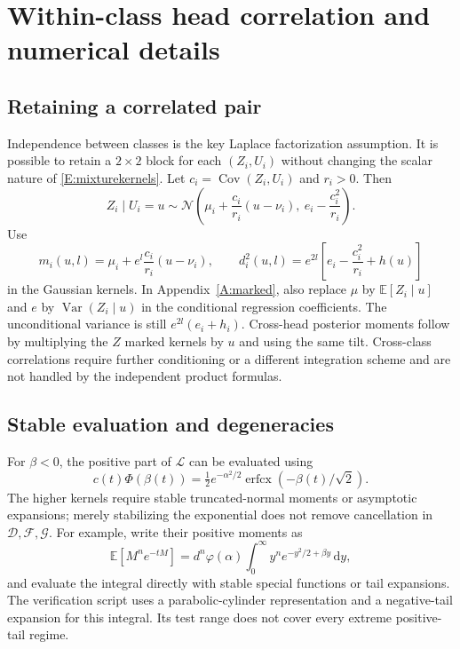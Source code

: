 \documentclass[letterpaper]{article}
\newcommand{\E}{\mathbb E}
\newcommand{\Var}{\operatorname{Var}}
\newcommand{\Cov}{\operatorname{Cov}}
\newcommand{\Normal}{\mathcal N}
\newcommand{\dd}{\,\mathrm d}
\newcommand{\given}{\mid}
\begin{document}
\section{Within-class head correlation and numerical details}\label{A:correlated}
\subsection{Retaining a correlated pair}
Independence between classes is the key Laplace factorization assumption. It is possible to retain a $2\times2$ block for each $(Z_i,U_i)$ without changing the scalar nature of \eqref{E:mixturekernels}. Let $c_i=\Cov(Z_i,U_i)$ and $r_i>0$. Then
\begin{equation}
Z_i\given U_i=u\sim\Normal\!\left(\mu_i+\frac{c_i}{r_i}(u-\nu_i),\ e_i-\frac{c_i^2}{r_i}\right).
\end{equation}
Use
\begin{equation}
m_i(u,l)=\mu_i+e^l\frac{c_i}{r_i}(u-\nu_i),\qquad
d_i^2(u,l)=e^{2l}\left[e_i-\frac{c_i^2}{r_i}+h(u)\right]
\end{equation}
in the Gaussian kernels. In Appendix~\ref{A:marked}, also replace $\mu$ by $\E[Z_i\given u]$ and $e$ by $\Var(Z_i\given u)$ in the conditional regression coefficients. The unconditional variance is still $e^{2l}(e_i+h_i)$. Cross-head posterior moments follow by multiplying the $Z$ marked kernels by $u$ and using the same tilt. Cross-class correlations require further conditioning or a different integration scheme and are not handled by the independent product formulas.

\subsection{Stable evaluation and degeneracies}
For $\beta<0$, the positive part of $\mathcal L$ can be evaluated using
\begin{equation}
c(t)\Phi(\beta(t))=\tfrac12e^{-\alpha^2/2}\operatorname{erfcx}(-\beta(t)/\sqrt2).
\end{equation}
The higher kernels require stable truncated-normal moments or asymptotic expansions; merely stabilizing the exponential does not remove cancellation in $\mathcal D,\mathcal F,\mathcal G$. For example, write their positive moments as
\begin{equation}
\E[M^n e^{-tM}]=d^n\varphi(\alpha)\int_0^\infty y^n e^{-y^2/2+\beta y}\dd y,
\end{equation}
and evaluate the integral directly with stable special functions or tail expansions. The verification script uses a parabolic-cylinder representation and a negative-tail expansion for this integral. Its test range does not cover every extreme positive-tail regime.
\end{document}
